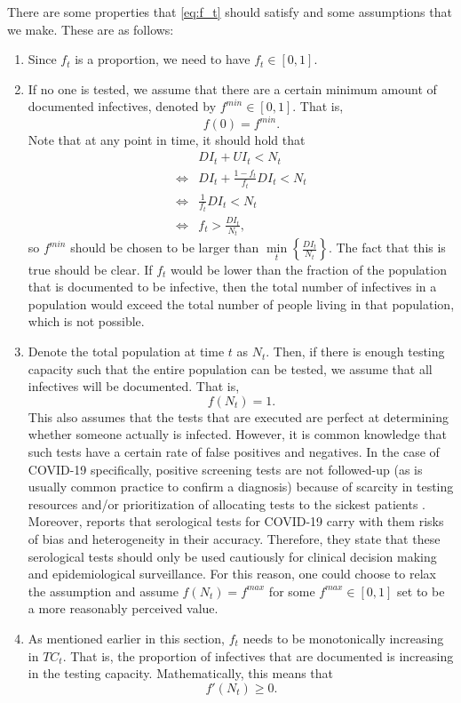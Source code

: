 \documentclass[12pt]{article}
\begin{document}
	There are some properties that \eqref{eq:f_t} should satisfy and some assumptions that we make. These are as follows:
	\begin{enumerate}[label=(A\arabic*)]
		\item\label{ass:undoc_proportion} Since $f_t$ is a proportion, we need to have $f_t \in [0,1]$.
		\item\label{ass:undoc_f0} If no one is tested, we assume that there are a certain minimum amount of documented infectives, denoted by $f^{min} \in [0,1]$. That is,
		    \[f(0) = f^{min}.\]
		Note that at any point in time, it should hold that
	    \begin{align*}
    	    & DI_t + UI_t < N_t \\
    	    \iff & DI_t + \frac{1-f_t}{f_t}DI_t < N_t \\
    	    \iff & \frac{1}{f_t}DI_t < N_t \\
    	    \iff & f_t > \frac{DI_t}{N_t},
	    \end{align*}
		so $f^{min}$ should be chosen to be larger than $\min\limits_{t}\left\{\frac{DI_t}{N_t}\right\}$. The fact that this is true should be clear. If $f_t$ would be lower than the fraction of the population that is documented to be infective, then the total number of infectives in a population would exceed the total number of people living in that population, which is not possible.
		
		\item\label{ass:undoc_fN} Denote the total population at time $t$ as $N_t$. Then, if there is enough testing capacity such that the entire population can be tested, we assume that all infectives will be documented. That is,
		    \[f(N_t) = 1.\]
		This also assumes that the tests that are executed are perfect at determining whether someone actually is infected. However, it is common knowledge that such tests have a certain rate of false positives and negatives. In the case of COVID-19 specifically, positive screening tests are not followed-up (as is usually common practice to confirm a diagnosis) because of scarcity in testing resources and/or prioritization of allocating tests to the sickest patients \parencite{frasier2020tests}. Moreover, \textcite{bmj2020testaccuracy} reports that serological tests for COVID-19 carry with them risks of bias and heterogeneity in their accuracy. Therefore, they state that these serological tests should only be used cautiously for clinical decision making and epidemiological surveillance. For this reason, one could choose to relax the assumption and assume $f(N_t) = f^{max}$ for some $f^{max} \in [0,1]$ set to be a more reasonably perceived value.
		
		\item\label{ass:undoc_monotonicity} As mentioned earlier in this section, $f_t$ needs to be monotonically increasing in $TC_t$. That is, the proportion of infectives that are documented is increasing in the testing capacity. Mathematically, this means that
		    \[f'(N_t) \geq 0.\]
	\end{enumerate}
	
\end{document}
